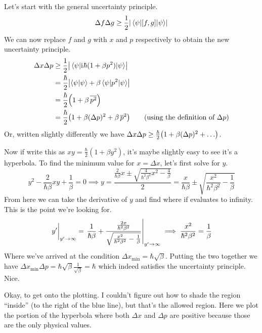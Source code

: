 \documentclass[boxes,pages]{homework}
\makeatletter
\newcommand{\iu}{\mathrm{i}\mkern1mu}
\numberwithin{@problem}{section}
\makeatother
\begin{document}
\begin{solution}
	Let's start with the general uncertainty principle.
	\begin{equation*}
		\Delta f\Delta g \geq \frac{1}{2}\abs{\expval{\comm{f}{g}}{\psi}}
	\end{equation*}
	We can now replace $f$ and $g$ with $x$ and $p$ respectively to obtain the new uncertainty principle.
	\begin{align*}
		\Delta x\Delta p & \geq \frac{1}{2}\abs{\expval{\iu\hbar(1 + \beta p^2)}{\psi}}                                                  \\
		                 & = \frac{\hbar}{2}\abs{\braket{\psi}{\psi} + \beta\expval{p^2}{\psi}}                                          \\
		                 & = \frac{\hbar}{2}\qty(1 + \beta\,\overline{p^2})                                                              \\
		                 & = \frac{\hbar}{2}\qty(1 + \beta(\Delta p)^2 + \beta\,\overline{p}^2) \tag{using the definition of $\Delta p$}
	\end{align*}
	Or, written slightly differently we have $\Delta x\Delta p\geq \frac{\hbar}{2}\qty(1 + \beta(\Delta p)^2 + \ldots)$.

	Now if write this as $xy = \frac{\hbar}{2}(1 + \beta y^2)$, it's maybe slightly easy to see it's a hyperbola. To find the minimum value for $x = \Delta x$, let's first solve for $y$.
	\begin{equation*}
		y^2 - \frac{2}{\hbar\beta}xy + \frac{1}{\beta} = 0 \implies y = \frac{\frac{2}{\hbar\beta}x \pm\sqrt{\frac{4}{\hbar^2\beta^2}x^2 - \frac{4}{\beta}}}{2} = \frac{x}{\hbar\beta} \pm\sqrt{\frac{x^2}{\hbar^2\beta^2} - \frac{1}{\beta}}
	\end{equation*}
	From here we can take the derivative of $y$ and find where if evaluates to infinity. This is the point we're looking for.
	\begin{equation*}
		\eval{y'}_{y'\to\infty} = \eval{\frac{1}{\hbar\beta} + \frac{\frac{2x}{\hbar^2\beta^2}}{\sqrt{\frac{x^2}{\hbar^2\beta^2} - \frac{1}{\beta}}}}_{y'\to\infty}\implies \frac{x^2}{\hbar^2\beta^2} = \frac{1}{\beta}
	\end{equation*}
	Where we've arrived at the condition $\Delta x_\text{min} = \hbar\sqrt{\beta}$. Putting the two together we have $\Delta x_\text{min}\Delta p = \hbar\sqrt{\beta}\frac{1}{\sqrt{\beta}} = \hbar$ which indeed satisfies the uncertainty principle. Nice.

	Okay, to get onto the plotting. I couldn't figure out how to shade the region ``inside'' (to the right of the blue line), but that's the allowed region. Here we plot the portion of the hyperbola where both $\Delta x$ and $\Delta p$ are positive because those are the only physical values.


\end{solution}
\end{document}
